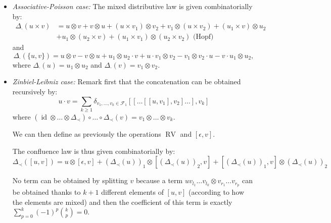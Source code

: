 \documentclass[11pt,leqno]{amsart}
\theoremstyle{definition}
\theoremstyle{plain}
\newcommand{\F}{ \mathcal{F} }
\begin{document}
\begin{itemize}
\item \emph{Associative-Poisson case:} 
The mixed distributive law is given combinatorially by:                                                                                                                                                                                                                                                                                                                                                                                           
\begin{align*}
\Delta_{\cdot}( u \times v)&= u \otimes v + v \otimes u + (u \times v_1) \otimes v_2 + v_1 \otimes (u \times v_2) + (u_1 \times v) \otimes u_2  \\
&+ u_1 \otimes (u_2 \times v) + (u_1 \times v_1) \otimes (u_2 \times v_2)\text{\ (Hopf)}
\end{align*}
 and
\begin{equation*}
 \Delta_{\cdot}(\lbrace u, v\rbrace) = u \otimes v -v \otimes u +u_1 \otimes u_2 \cdot v + u \cdot v_1 \otimes v_2 -v_1 \otimes v_2 \cdot u - v \cdot u_1 \otimes u_2,
\end{equation*}
where $\Delta_{\cdot}(u)=u_1 \otimes u_2$ and $\Delta_{\cdot}(v) = v_1 \otimes v_2$. 

\item \emph{Zinbiel-Leibniz case:} 
Remark first that the concatenation can be obtained recursively by:
\begin{equation*}
u \cdot v = \sum_{k \geq 1} \delta_{v_1, \ldots, v_k \in \F_1} [[ \ldots [[u, v_1],v_2]\ldots],v_k]
\end{equation*}
where $(\operatorname{id} \otimes \ldots \otimes \Delta_{\prec}) \circ \ldots \circ \Delta_{\prec}(v)=v_1 \otimes \ldots \otimes v_k$.

We can then define as previously the operations $\operatorname{RV}$ and $[\epsilon,v]$.
 
The confluence law is thus given combinatorially by:
\begin{equation*}
\Delta_{\prec}([u,v]) = u \otimes [\epsilon,v] + \left(\Delta_{\prec}(u)\right)_1  \otimes \left[ \left(\Delta_{\prec}(u)\right)_2 , v \right] + \left[ \left(\Delta_{\prec}(u)\right)_1 , v \right] \otimes \left(\Delta_{\prec}(u)\right)_2
\end{equation*}

No term can be obtained by splitting $v$ because a term $uv_{l_1} \ldots v_{l_k} \otimes v_{r_1} \ldots v_{r_p}$ can be obtained thanks to $k+1$ different elements of $[u,v]$ (according to how the elements are mixed) and then the coefficient of this term is exactly $\sum_{p=0}^k (-1)^p \binom{k}{p} = 0$.

\end{itemize}
\end{document}
